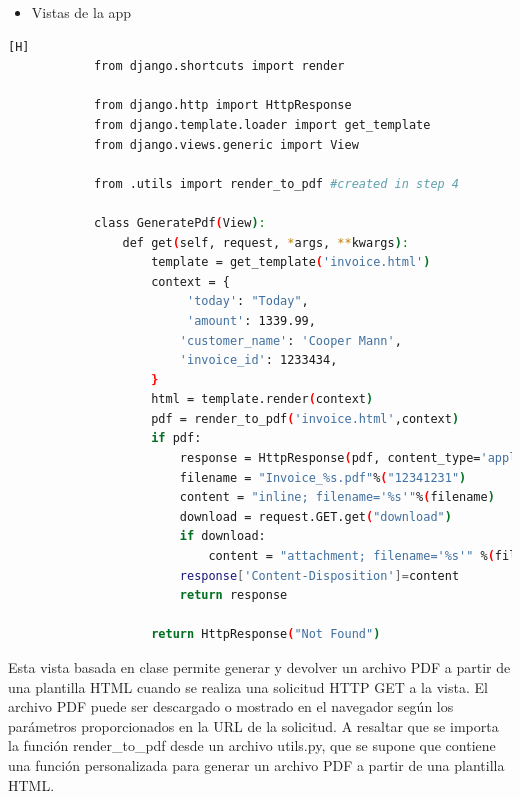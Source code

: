 \documentclass{article}
\begin{document}
         \begin{itemize}
            \item Vistas de la app
        \end{itemize}
        \begin{lstlisting}[language=bash,caption={Archivo pdf/views.py}][H]
            from django.shortcuts import render

            from django.http import HttpResponse
            from django.template.loader import get_template
            from django.views.generic import View
            
            from .utils import render_to_pdf #created in step 4
            
            class GeneratePdf(View):
                def get(self, request, *args, **kwargs):
                    template = get_template('invoice.html')
                    context = {
                         'today': "Today", 
                         'amount': 1339.99,
                        'customer_name': 'Cooper Mann',
                        'invoice_id': 1233434,
                    }
                    html = template.render(context)
                    pdf = render_to_pdf('invoice.html',context)
                    if pdf:
                        response = HttpResponse(pdf, content_type='application/pdf')
                        filename = "Invoice_%s.pdf"%("12341231")
                        content = "inline; filename='%s'"%(filename)
                        download = request.GET.get("download")
                        if download:
                            content = "attachment; filename='%s'" %(filename)
                        response['Content-Disposition']=content
                        return response  
            
                    return HttpResponse("Not Found")
	\end{lstlisting}
        Esta vista basada en clase permite generar y devolver un archivo PDF a partir de una plantilla HTML cuando se realiza una solicitud HTTP GET a la vista. El archivo PDF puede ser descargado o mostrado en el navegador según los parámetros proporcionados en la URL de la solicitud. A resaltar que se importa la función render\_to\_pdf desde un archivo utils.py, que se supone que contiene una función personalizada para generar un archivo PDF a partir de una plantilla HTML.\newline
\end{document}
